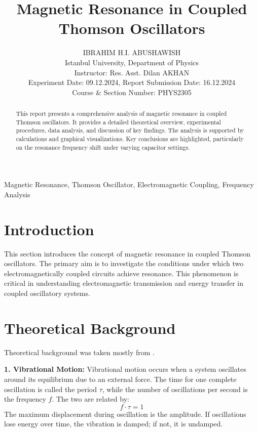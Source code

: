 \documentclass[journal]{IEEEtran}
\begin{document}
\title{Magnetic Resonance in Coupled Thomson Oscillators}
\author{IBRAHIM H.I. ABUSHAWISH \\
Istanbul University, Department of Physics \\
Instructor: Res. Asst. Dilan AKHAN  \\
Experiment Date: 09.12.2024, Report Submission Date: 16.12.2024 \\
Course \& Section Number: PHYS2305}

\maketitle


\begin{abstract}
This report presents a comprehensive analysis of magnetic resonance in coupled Thomson oscillators. It provides a detailed theoretical overview, experimental procedures, data analysis, and discussion of key findings. The analysis is supported by calculations and graphical visualizations. Key conclusions are highlighted, particularly on the resonance frequency shift under varying capacitor settings.
\end{abstract}


\begin{IEEEkeywords}
Magnetic Resonance, Thomson Oscillator, Electromagnetic Coupling, Frequency Analysis
\end{IEEEkeywords}




\section{Introduction}
This section introduces the concept of magnetic resonance in coupled Thomson oscillators. The primary aim is to investigate the conditions under which two electromagnetically coupled circuits achieve resonance. This phenomenon is critical in understanding electromagnetic transmission and energy transfer in coupled oscillatory systems.
\section{Theoretical Background}
Theoretical background was taken mostly from \cite{lab_manual}.

\textbf{1. Vibrational Motion:}
Vibrational motion occurs when a system oscillates around its equilibrium due to an external force. The time for one complete oscillation is called the period \(\tau\), while the number of oscillations per second is the frequency \(f\). The two are related by:
\begin{equation}
    f \cdot \tau = 1
\end{equation}
The maximum displacement during oscillation is the amplitude. If oscillations lose energy over time, the vibration is damped; if not, it is undamped.
\end{document}
